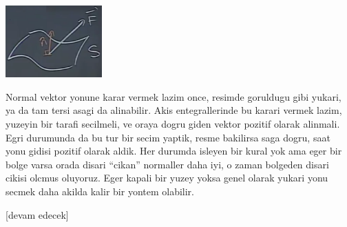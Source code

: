 \documentclass[12pt,fleqn]{article}\usepackage{../../common}
\begin{document}
\includegraphics[width=10em]{calc_multi_27_03.png}

Normal vektor yonune karar vermek lazim once, resimde goruldugu gibi yukari, ya
da tam tersi asagi da alinabilir. Akis entegrallerinde bu karari vermek lazim,
yuzeyin bir tarafi secilmeli, ve oraya dogru giden vektor pozitif olarak
alinmali. Egri durumunda da bu tur bir secim yaptik, resme bakilirsa saga dogru,
saat yonu gidisi pozitif olarak aldik. Her durumda isleyen bir kural yok ama
eger bir bolge varsa orada disari ``cikan'' normaller daha iyi, o zaman bolgeden
disari cikisi olcmus oluyoruz.  Eger kapali bir yuzey yoksa genel olarak yukari
yonu secmek daha akilda kalir bir yontem olabilir.










[devam edecek]
\end{document}
